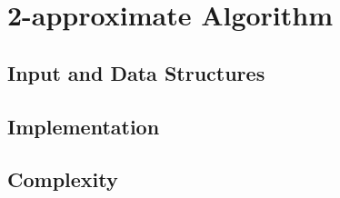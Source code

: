 \section{2-approximate Algorithm}\label{2-approximate}


\subsection{Input and Data Structures}


\subsection{Implementation}


\subsection{Complexity}


\pagebreak